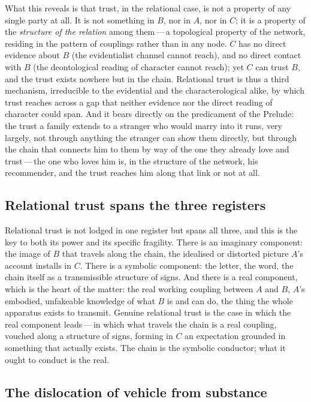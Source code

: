 What this reveals is that trust, in the relational case, is not a property of any single party at all. It is not something in $B$, nor in $A$, nor in $C$; it is a property of the \emph{structure of the relation} among them\,---\,a topological property of the network, residing in the pattern of couplings rather than in any node. $C$ has no direct evidence about $B$ (the evidentialist channel cannot reach), and no direct contact with $B$ (the deontological reading of character cannot reach); yet $C$ can trust $B$, and the trust exists nowhere but in the chain. Relational trust is thus a third mechanism, irreducible to the evidential and the characterological alike, by which trust reaches across a gap that neither evidence nor the direct reading of character could span. And it bears directly on the predicament of the Prelude: the trust a family extends to a stranger who would marry into it runs, very largely, not through anything the stranger can show them directly, but through the chain that connects him to them by way of the one they already love and trust\,---\,the one who loves him is, in the structure of the network, his recommender, and the trust reaches him along that link or not at all.

\subsection{Relational trust spans the three registers}
\label{p13:sub:rel-threeregisters}

Relational trust is not lodged in one register but spans all three, and this is the key to both its power and its specific fragility. There is an imaginary component: the image of $B$ that travels along the chain, the idealised or distorted picture $A$'s account installs in $C$. There is a symbolic component: the letter, the word, the chain itself as a transmissible structure of signs. And there is a real component, which is the heart of the matter: the real working coupling between $A$ and $B$, $A$'s embodied, unfakeable knowledge of what $B$ is and can do, the thing the whole apparatus exists to transmit. Genuine relational trust is the case in which the real component leads\,---\,in which what travels the chain is a real coupling, vouched along a structure of signs, forming in $C$ an expectation grounded in something that actually exists. The chain is the symbolic conductor; what it ought to conduct is the real.

\subsection{The dislocation of vehicle from substance}
\label{p13:sub:rel-dislocation}

